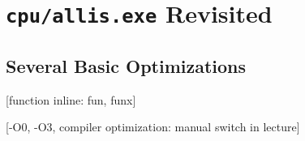 \documentclass[main]{subfiles}
\begin{document}
\section{\texttt{cpu/allis.exe} Revisited}
\subsection{Several Basic Optimizations}
[function inline: fun, funx]

[-O0, -O3, compiler optimization: manual switch in lecture] 
\end{document}
